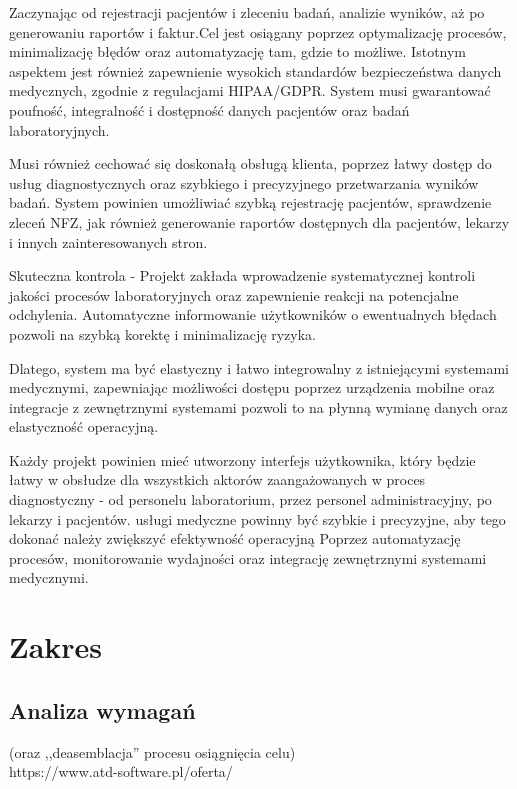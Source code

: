 \documentclass[12pt,a4paper]{article}
\begin{document}
Zaczynając od rejestracji pacjentów i zleceniu badań, analizie wyników, aż po generowaniu raportów i faktur.Cel jest osiągany poprzez optymalizację procesów, minimalizację błędów oraz automatyzację tam, gdzie to możliwe. Istotnym aspektem jest również zapewnienie wysokich standardów bezpieczeństwa danych medycznych, zgodnie z regulacjami HIPAA/GDPR. System musi gwarantować poufność, integralność i dostępność danych pacjentów oraz badań laboratoryjnych.

Musi również cechować się doskonałą obsługą klienta, poprzez łatwy dostęp do usług diagnostycznych oraz szybkiego i precyzyjnego przetwarzania wyników badań. System powinien umożliwiać szybką rejestrację pacjentów, sprawdzenie zleceń NFZ, jak również generowanie raportów dostępnych dla pacjentów, lekarzy i innych zainteresowanych stron. 

Skuteczna kontrola - Projekt zakłada wprowadzenie systematycznej kontroli jakości procesów laboratoryjnych oraz zapewnienie reakcji na potencjalne odchylenia. Automatyczne informowanie użytkowników o ewentualnych błędach pozwoli na szybką korektę i minimalizację ryzyka.

Dlatego, system ma być elastyczny i łatwo integrowalny z istniejącymi systemami medycznymi, zapewniając możliwości dostępu poprzez urządzenia mobilne oraz integracje z zewnętrznymi systemami pozwoli to  na płynną wymianę danych oraz elastyczność operacyjną. 

Każdy projekt powinien mieć utworzony interfejs użytkownika, który będzie łatwy w obsłudze dla wszystkich aktorów zaangażowanych w proces diagnostyczny - od personelu laboratorium, przez personel administracyjny, po lekarzy i pacjentów.  usługi medyczne powinny być  szybkie i  precyzyjne, aby tego dokonać należy zwiększyć efektywność operacyjną Poprzez automatyzację procesów, monitorowanie wydajności oraz integrację zewnętrznymi systemami medycznymi.



\newpage
\section{Zakres}

\subsection{Analiza wymagań}
 (oraz ,,deasemblacja'' procesu osiągnięcia celu)
\\
 https://www.atd-software.pl/oferta/
\\ 
\end{document}

